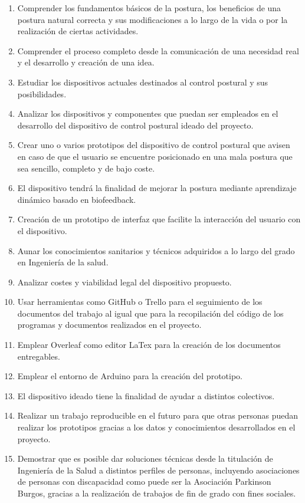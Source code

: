 \begin{enumerate}
    \item Comprender los fundamentos básicos de la postura, los beneficios de una postura natural correcta y sus modificaciones a lo largo de la vida o por la realización de ciertas actividades.
    \item Comprender el proceso completo desde la comunicación de una necesidad real y el desarrollo y creación de una idea.
    \item Estudiar los dispositivos actuales destinados al control postural y sus posibilidades.
    \item Analizar los dispositivos y componentes que puedan ser empleados en el desarrollo del dispositivo de control postural ideado del proyecto.
    \item Crear uno o varios prototipos del dispositivo de control postural que avisen en caso de que el usuario se encuentre posicionado en una mala postura que sea sencillo, completo y de bajo coste.
    \item El dispositivo tendrá la finalidad de mejorar la postura mediante aprendizaje dinámico basado en biofeedback.
    \item Creación de un prototipo de interfaz que facilite la interacción del usuario con el dispositivo.
    \item Aunar los conocimientos sanitarios y técnicos adquiridos a lo largo del grado en Ingeniería de la salud.
    \item Analizar costes y viabilidad legal del dispositivo propuesto.
    \item Usar herramientas como GitHub\cite{GitHub} o Trello\cite{Trello} para el seguimiento de los documentos del trabajo al igual que para la recopilación del código de los programas y documentos realizados en el proyecto.
    \item Emplear Overleaf como editor LaTex para la creación de los documentos entregables.
    \item Emplear el entorno de Arduino para la creación del prototipo.
    \item El dispositivo ideado tiene la finalidad de ayudar a distintos colectivos.
    \item Realizar un trabajo reproducible en el futuro para que otras personas puedan realizar los prototipos gracias a los datos y conocimientos desarrollados en el proyecto.
    \item Demostrar que es posible dar soluciones técnicas desde la titulación de Ingeniería de la Salud a distintos perfiles de personas, incluyendo asociaciones de personas con discapacidad como puede ser la Asociación Parkinson Burgos\cite{ParkinsonBurgos}, gracias a la realización de trabajos de fin de grado con fines sociales.
\end{enumerate}









